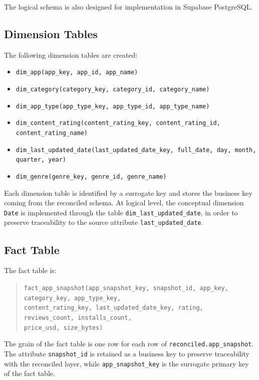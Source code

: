 \documentclass[11pt,a4paper]{article}
\newcommand{\dbms}{Supabase PostgreSQL}
\begin{document}
The logical schema is also designed for implementation in \dbms.

\subsection{Dimension Tables}
The following dimension tables are created:
\begin{itemize}[leftmargin=1.5em]
    \item \texttt{dim\_app(app\_key, app\_id, app\_name)}
    \item \texttt{dim\_category(category\_key, category\_id, category\_name)}
    \item \texttt{dim\_app\_type(app\_type\_key, app\_type\_id, app\_type\_name)}
    \item \texttt{dim\_content\_rating(content\_rating\_key, content\_rating\_id, content\_rating\_name)}
    \item \texttt{dim\_last\_updated\_date(last\_updated\_date\_key, full\_date, day, month, quarter, year)}
    \item \texttt{dim\_genre(genre\_key, genre\_id, genre\_name)}
\end{itemize}

Each dimension table is identified by a surrogate key and stores the business key coming from the reconciled schema. At logical level, the conceptual dimension \texttt{Date} is implemented through the table \texttt{dim\_last\_updated\_date}, in order to preserve traceability to the source attribute \texttt{last\_updated\_date}.

\subsection{Fact Table}
The fact table is:
\begin{quote}
\texttt{fact\_app\_snapshot(app\_snapshot\_key, snapshot\_id, app\_key, category\_key, app\_type\_key,} \\
\texttt{content\_rating\_key, last\_updated\_date\_key, rating, reviews\_count, installs\_count,} \\
\texttt{price\_usd, size\_bytes)}
\end{quote}

The grain of the fact table is one row for each row of \texttt{reconciled.app\_snapshot}. The attribute \texttt{snapshot\_id} is retained as a business key to preserve traceability with the reconciled layer, while \texttt{app\_snapshot\_key} is the surrogate primary key of the fact table.
\end{document}
